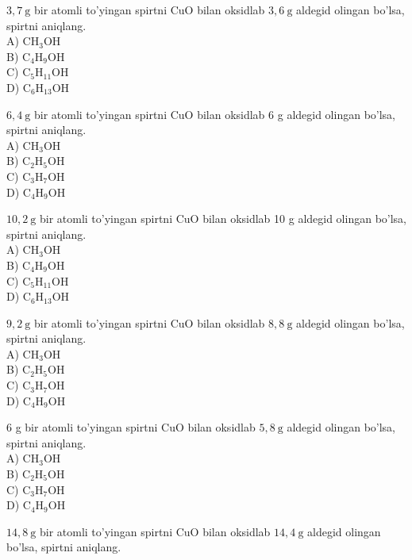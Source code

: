   \item $3,7 \mathrm{~g}$ bir atomli to'yingan spirtni CuO bilan oksidlab $3,6 \mathrm{~g}$ aldegid olingan bo'lsa, spirtni aniqlang.\\
A) $\mathrm{CH}_{3} \mathrm{OH}$\\
B) $\mathrm{C}_{4} \mathrm{H}_{9} \mathrm{OH}$\\
C) $\mathrm{C}_{5} \mathrm{H}_{11} \mathrm{OH}$\\
D) $\mathrm{C}_{6} \mathrm{H}_{13} \mathrm{OH}$
  \item $6,4 \mathrm{~g}$ bir atomli to'yingan spirtni CuO bilan oksidlab 6 g aldegid olingan bo'lsa, spirtni aniqlang.\\
A) $\mathrm{CH}_{3} \mathrm{OH}$\\
B) $\mathrm{C}_{2} \mathrm{H}_{5} \mathrm{OH}$\\
C) $\mathrm{C}_{3} \mathrm{H}_{7} \mathrm{OH}$\\
D) $\mathrm{C}_{4} \mathrm{H}_{9} \mathrm{OH}$
  \item $10,2 \mathrm{~g}$ bir atomli to'yingan spirtni CuO bilan oksidlab 10 g aldegid olingan bo'lsa, spirtni aniqlang.\\
A) $\mathrm{CH}_{3} \mathrm{OH}$\\
B) $\mathrm{C}_{4} \mathrm{H}_{9} \mathrm{OH}$\\
C) $\mathrm{C}_{5} \mathrm{H}_{11} \mathrm{OH}$\\
D) $\mathrm{C}_{6} \mathrm{H}_{13} \mathrm{OH}$
  \item $9,2 \mathrm{~g}$ bir atomli to'yingan spirtni CuO bilan oksidlab $8,8 \mathrm{~g}$ aldegid olingan bo'lsa, spirtni aniqlang.\\
A) $\mathrm{CH}_{3} \mathrm{OH}$\\
B) $\mathrm{C}_{2} \mathrm{H}_{5} \mathrm{OH}$\\
C) $\mathrm{C}_{3} \mathrm{H}_{7} \mathrm{OH}$\\
D) $\mathrm{C}_{4} \mathrm{H}_{9} \mathrm{OH}$
  \item 6 g bir atomli to'yingan spirtni CuO bilan oksidlab $5,8 \mathrm{~g}$ aldegid olingan bo'lsa, spirtni aniqlang.\\
A) $\mathrm{CH}_{3} \mathrm{OH}$\\
B) $\mathrm{C}_{2} \mathrm{H}_{5} \mathrm{OH}$\\
C) $\mathrm{C}_{3} \mathrm{H}_{7} \mathrm{OH}$\\
D) $\mathrm{C}_{4} \mathrm{H}_{9} \mathrm{OH}$
  \item $14,8 \mathrm{~g}$ bir atomli to'yingan spirtni CuO bilan oksidlab $14,4 \mathrm{~g}$ aldegid olingan bo'lsa, spirtni aniqlang.\\

